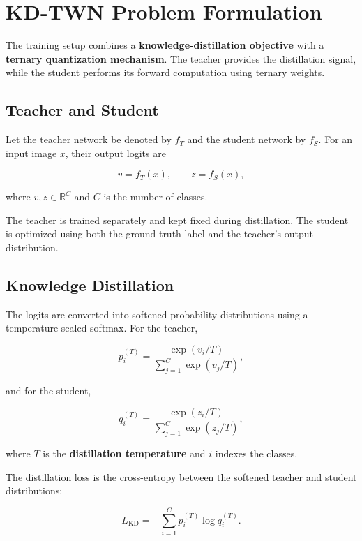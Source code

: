 \documentclass[conference]{IEEEtran}
\begin{document}
\section{KD-TWN Problem Formulation}

The training setup combines a
\textbf{knowledge-distillation objective} with a
\textbf{ternary quantization mechanism}. The teacher provides the
distillation signal, while the student performs its forward computation
using ternary weights.

\subsection{Teacher and Student}

Let the teacher network be denoted by $f_T$ and the student network by
$f_S$. For an input image $x$, their output logits are

\begin{equation}
v = f_T(x),
\qquad
z = f_S(x),
\end{equation}

where $v,z \in \mathbb{R}^{C}$ and $C$ is the number of classes.

The teacher is trained separately and kept fixed during distillation.
The student is optimized using both the ground-truth label and the
teacher's output distribution.

\subsection{Knowledge Distillation}

The logits are converted into softened probability distributions using a
temperature-scaled softmax. For the teacher,

\begin{equation}
p_i^{(T)} =
\frac{\exp(v_i/T)}
{\sum_{j=1}^{C}\exp(v_j/T)},
\end{equation}

and for the student,

\begin{equation}
q_i^{(T)} =
\frac{\exp(z_i/T)}
{\sum_{j=1}^{C}\exp(z_j/T)},
\end{equation}

where $T$ is the \textbf{distillation temperature} and $i$ indexes the
classes.

The distillation loss is the cross-entropy between the softened teacher
and student distributions:

\begin{equation}
L_{\mathrm{KD}}
=
-\sum_{i=1}^{C}p_i^{(T)}\log q_i^{(T)}.
\end{equation}
\end{document}
